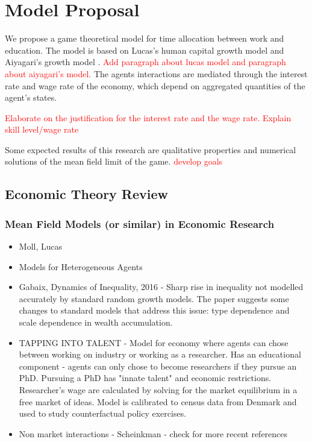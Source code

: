 \documentclass{article}
\begin{document}
\section{Model Proposal}
We propose a game theoretical model for time allocation between work and education.
The model is based on Lucas's human capital growth model \cite{lucas1988mechanics} and Aiyagari’s growth model \cite{achdou2014partial,carmona2018probabilistic}.
\textcolor{red}{Add paragraph about lucas model and paragraph about aiyagari's model.}
The agents interactions are mediated through the interest rate and wage rate of the economy, which depend on aggregated quantities of the agent's states.

\textcolor{red}{Elaborate on the justification for the interest rate and the wage rate.
Explain skill level/wage rate}

Some expected results of this research are qualitative properties and numerical solutions of the mean field limit of the game. \textcolor{red}{develop goals}

\subsection{Economic Theory Review}

\subsubsection{ Mean Field Models (or similar) in Economic Research}
\begin{itemize}
    \item Moll, Lucas
    \item Models for Heterogeneous Agents
    \item Gabaix, Dynamics of Inequality, 2016 - Sharp rise in inequality not modelled accurately by standard random growth models. The paper suggests some changes to standard models that address this issue: type dependence and scale dependence in wealth accumulation.
    \item TAPPING INTO TALENT - Model for economy where agents can chose between working on industry or working as a researcher. Has an educational component - agents can only chose to become researchers if they pursue an PhD. Pursuing a PhD has "innate talent" and economic restrictions. Researcher's wage are calculated by solving for the market equilibrium in a free market of ideas. Model is calibrated to census data from Denmark and used to study counterfactual policy exercises.
    \item Non market interactions - Scheinkman - check for more recent references
\end{itemize}
\end{document}
